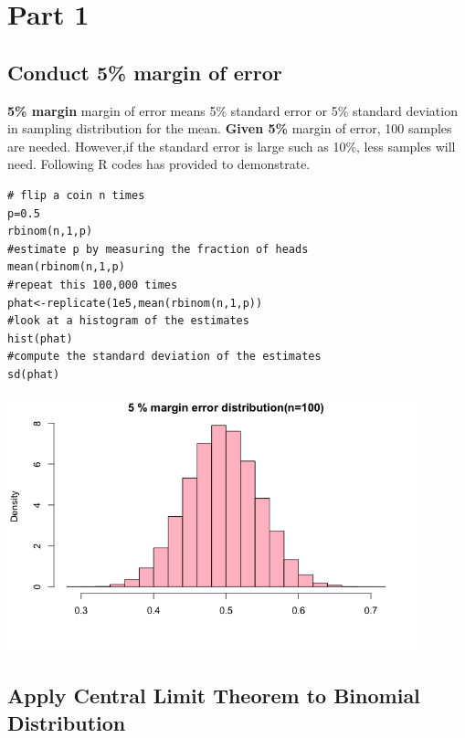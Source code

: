 \section{Part 1}
\subsection{Conduct 5\% margin of error}

\textbf{5\% margin} margin of error means 5\% standard error or 5\% standard deviation in sampling distribution for the mean.
\newline\textbf{Given 5\%} margin of error, 100 samples are needed. However,if the standard error is large such as 10\%, less samples will need. Following R codes has provided to demonstrate.
\begin{lstlisting}
# flip a coin n times 
p=0.5
rbinom(n,1,p)
#estimate p by measuring the fraction of heads
mean(rbinom(n,1,p)
#repeat this 100,000 times
phat<-replicate(1e5,mean(rbinom(n,1,p))
#look at a histogram of the estimates
hist(phat)
#compute the standard deviation of the estimates
sd(phat)
\end{lstlisting}

\includegraphics[width=12cm]{figures/ddg}


\subsection{Apply Central Limit Theorem to Binomial Distribution}



